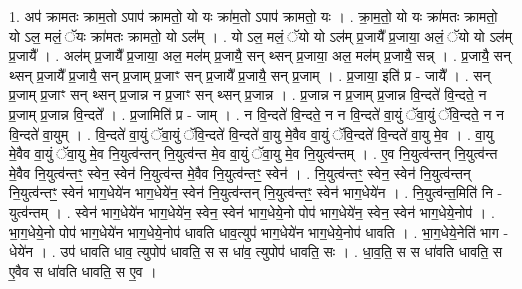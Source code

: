 \documentclass[17pt]{extarticle}
\begin{document}
1. अप॑ क्रामतः क्राम॒तो ऽपाप॑ क्रामतो॒ यो यः क्रा॑म॒तो ऽपाप॑ क्रामतो॒ यः । . क्रा॒म॒तो॒ यो यः क्रा॑मतः क्रामतो॒ यो ऽल॒ मलं॒ ॅयः क्रा॑मतः क्रामतो॒ यो ऽल᳚म् । . यो ऽल॒ मलं॒ ॅयो यो ऽल॑म् प्र॒जायै᳚ प्र॒जाया॒ अलं॒ ॅयो यो ऽल॑म् प्र॒जायै᳚ । . अल॑म् प्र॒जायै᳚ प्र॒जाया॒ अल॒ मल॑म् प्र॒जायै॒ सन् थ्सन् प्र॒जाया॒ अल॒ मल॑म् प्र॒जायै॒ सन्न् । . प्र॒जायै॒ सन् थ्सन् प्र॒जायै᳚ प्र॒जायै॒ सन् प्र॒जाम् प्र॒जाꣳ सन् प्र॒जायै᳚ प्र॒जायै॒ सन् प्र॒जाम् । . प्र॒जाया॒ इति॑ प्र - जायै᳚ । . सन् प्र॒जाम् प्र॒जाꣳ सन् थ्सन् प्र॒जान्न न प्र॒जाꣳ सन् थ्सन् प्र॒जान्न । . प्र॒जान्न न प्र॒जाम् प्र॒जान्न वि॒न्दते॑ वि॒न्दते॒ न प्र॒जाम् प्र॒जान्न वि॒न्दते᳚ । . प्र॒जामिति॑ प्र - जाम् । . न वि॒न्दते॑ वि॒न्दते॒ न न वि॒न्दते॑ वा॒युं ॅवा॒युं ॅवि॒न्दते॒ न न वि॒न्दते॑ वा॒युम् । . वि॒न्दते॑ वा॒युं ॅवा॒युं ॅवि॒न्दते॑ वि॒न्दते॑ वा॒यु मे॒वैव वा॒युं ॅवि॒न्दते॑ वि॒न्दते॑ वा॒यु मे॒व । . वा॒यु मे॒वैव वा॒युं ॅवा॒यु मे॒व नि॒युत्व॑न्तन् नि॒युत्व॑न्त मे॒व वा॒युं ॅवा॒यु मे॒व नि॒युत्व॑न्तम् । . ए॒व नि॒युत्व॑न्तन् नि॒युत्व॑न्त मे॒वैव नि॒युत्व॑न्तꣳ॒॒ स्वेन॒ स्वेन॑ नि॒युत्व॑न्त मे॒वैव नि॒युत्व॑न्तꣳ॒॒ स्वेन॑ । . नि॒युत्व॑न्तꣳ॒॒ स्वेन॒ स्वेन॑ नि॒युत्व॑न्तन् नि॒युत्व॑न्तꣳ॒॒ स्वेन॑ भाग॒धेये॑न भाग॒धेये॑न॒ स्वेन॑ नि॒युत्व॑न्तन् नि॒युत्व॑न्तꣳ॒॒ स्वेन॑ भाग॒धेये॑न । . नि॒युत्व॑न्त॒मिति॑ नि - युत्व॑न्तम् । . स्वेन॑ भाग॒धेये॑न भाग॒धेये॑न॒ स्वेन॒ स्वेन॑ भाग॒धेये॒नो पोप॑ भाग॒धेये॑न॒ स्वेन॒ स्वेन॑ भाग॒धेये॒नोप॑ । . भा॒ग॒धेये॒नो पोप॑ भाग॒धेये॑न भाग॒धेये॒नोप॑ धावति धाव॒त्युप॑ भाग॒धेये॑न भाग॒धेये॒नोप॑ धावति । . भा॒ग॒धेये॒नेति॑ भाग - धेये॑न । . उप॑ धावति धाव॒ त्युपोप॑ धावति॒ स स धा॑व॒ त्युपोप॑ धावति॒ सः । . धा॒व॒ति॒ स स धा॑वति धावति॒ स ए॒वैव स धा॑वति धावति॒ स ए॒व । \newline
\end{document}
